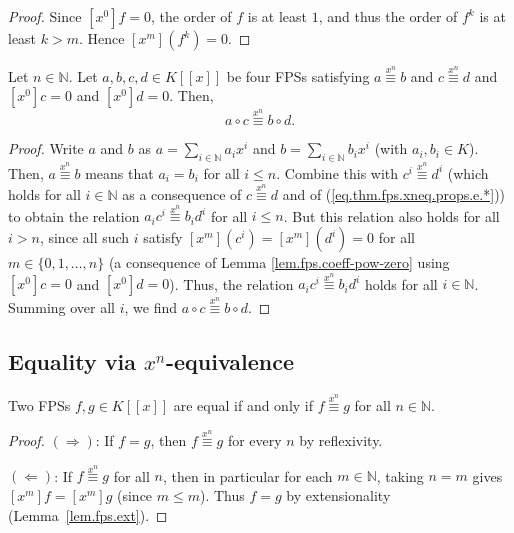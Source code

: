 \begin{proof}
\leanok
Since $[x^0]f=0$, the order of $f$ is at least $1$, and thus the order of $f^k$
is at least $k>m$. Hence $[x^m](f^k)=0$.
\end{proof}

\begin{proposition}
\label{prop.fps.xneq.comp}
\leantarget
\leanok
Let $n\in\mathbb{N}$. Let $a,b,c,d\in K\left[\left[x\right]\right]$ be four
FPSs satisfying $a\overset{x^{n}}{\equiv}b$ and $c\overset{x^{n}}{\equiv}d$
and $[x^{0}]c=0$ and $[x^{0}]d=0$. Then,
\[
a\circ c\overset{x^{n}}{\equiv}b\circ d.
\]
\end{proposition}

\begin{proof}
Write $a$ and $b$ as $a=\sum_{i\in\mathbb{N}}a_{i}x^{i}$ and
$b=\sum_{i\in\mathbb{N}}b_{i}x^{i}$ (with $a_{i},b_{i}\in K$).
Then, $a\overset{x^{n}}{\equiv}b$ means that $a_{i}=b_{i}$ for all $i\leq n$.
Combine this with $c^{i}\overset{x^{n}}{\equiv}d^{i}$ (which holds for all
$i\in\mathbb{N}$ as a consequence of $c\overset{x^{n}}{\equiv}d$ and of
(\ref{eq.thm.fps.xneq.props.e.*})) to obtain the relation
$a_{i}c^{i}\overset{x^{n}}{\equiv}b_{i}d^{i}$ for all $i\leq n$. But this
relation also holds for all $i>n$, since all such $i$ satisfy
$[x^{m}](c^{i})=[x^{m}](d^{i})=0$ for all $m\in\{0,1,\ldots,n\}$ (a
consequence of Lemma \ref{lem.fps.coeff-pow-zero} using $[x^{0}]c=0$ and
$[x^{0}]d=0$). Thus, the relation $a_{i}c^{i}\overset{x^{n}}{\equiv}b_{i}d^{i}$
holds for all $i\in\mathbb{N}$. Summing over all $i$, we find
$a\circ c\overset{x^{n}}{\equiv}b\circ d$.
\end{proof}

\subsection{Equality via $x^n$-equivalence}

\begin{lemma}
\label{lem.fps.eq-iff-forall-xneq}
\leanhelper
\leanok
Two FPSs $f,g\in K[[x]]$ are equal if and only if $f\overset{x^{n}}{\equiv}g$
for all $n\in\mathbb{N}$.
\end{lemma}

\begin{proof}
\leanok
$(\Longrightarrow)$: If $f=g$, then $f\overset{x^{n}}{\equiv}g$ for every $n$
by reflexivity.

$(\Longleftarrow)$: If $f\overset{x^{n}}{\equiv}g$ for all $n$, then in
particular for each $m\in\mathbb{N}$, taking $n=m$ gives
$[x^m]f=[x^m]g$ (since $m\leq m$). Thus $f=g$ by extensionality
(Lemma~\ref{lem.fps.ext}).
\end{proof}
